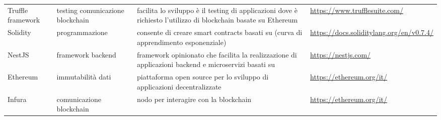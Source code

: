 \begin{longtable}{ C{1.5cm} C{3cm} C{5cm} C{3.5cm} }
    {Truffle framework} & {testing comunicazione blockchain} & {facilita lo sviluppo è il testing di applicazioni dove è richiesto l'utilizzo di blockchain basate su Ethereum} & {\url{https://www.trufflesuite.com/}}\\
    {Solidity} & {programmazione  } & {consente di creare smart contracts basati su (curva di apprendimento esponenziale)} & {\url{https://docs.soliditylang.org/en/v0.7.4/}}\\
    {NestJS} & {framework backend} & {framework opinionato che facilita la realizzazione di applicazioni backend e microservizi basati su } & {\url{https://nestjs.com/}}\\
    {Ethereum} & {immutabilità dati} & {piattaforma open source per lo sviluppo di applicazioni decentralizzate} & {\url{https://ethereum.org/it/}}\\
    {Infura} & {comunicazione blockchain} & {nodo per interagire con la blockchain} & {\url{https://ethereum.org/it/}}\\
\end{longtable}

 
